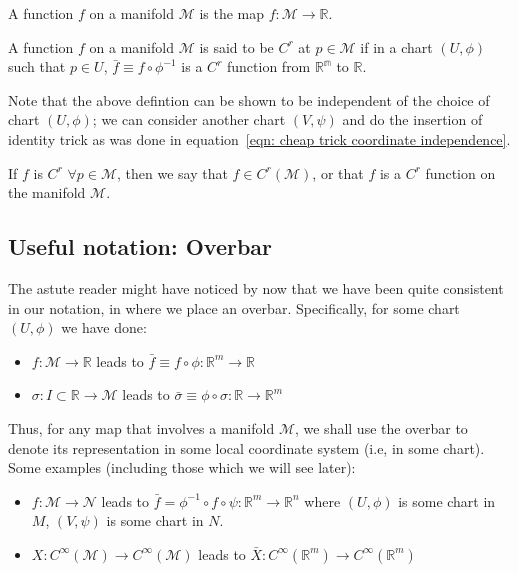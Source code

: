     \begin{definition}
      A function $f$ on a manifold $\mathcal{M}$ is the map $f:\mathcal{M}
      \rightarrow \mathbb{R}$.
    \end{definition}
    \begin{definition}
      A function $f$ on a manifold $\mathcal{M}$ is said to be $C^r$ at $p
      \in \mathcal{M}$ if in a chart $(U,\phi)$ such that $p\in U$,
      $\bar{f} \equiv f \circ \phi^{-1}$ is a $C^r$ function from
      $\mathbb{R^m}$ to $\mathbb{R}$.

      Note that the above defintion can be shown to be independent of the
      choice of chart $(U,\phi)$; we can consider another chart $(V, \psi)$
      and do the insertion of identity trick as was done in
      equation~\ref{eqn: cheap trick coordinate independence}.

      If $f$ is $C^r \,\, \forall p \in \mathcal{M}$, then we say that $f \in
      C^r(\mathcal{M})$, or that $f$ is a $C^r$ function on the manifold
      $\mathcal{M}$.
    \end{definition}
    \subsection{Useful notation: Overbar}
      The astute reader might have noticed by now that we have been quite
      consistent in our notation, in where we place an overbar.
      Specifically, for some chart $(U,\phi)$ we have done:
      \begin{itemize}
        \item{$f:\mathcal{M}\rightarrow \mathbb{R}$ leads to $\bar{f} \equiv f \circ \phi:\mathbb{R}^m \rightarrow \mathbb{R}$}
        \item{$\sigma:I \subset \mathbb{R} \rightarrow \mathcal{M}$ leads to
        $\bar{\sigma}\equiv \phi \circ \sigma: \mathbb{R} \rightarrow \mathbb{R}^m$}
      \end{itemize}
      Thus, for any map that involves a manifold $\mathcal{M}$, we shall
      use the overbar to denote its representation in some local coordinate
      system (i.e, in some chart). Some examples (including those which we will see later):
      \begin{itemize}
        \item{$f:\mathcal{M}\rightarrow \mathcal{N}$ leads to $\bar{f} =
        \phi^{-1}\circ f \circ \psi: \mathbb{R}^m \rightarrow \mathbb{R}^n$
        where $(U,\phi)$ is some chart in $M$, $(V,\psi)$ is some chart in
        $N$.}
        \item{$X: C^\infty(\mathcal{M})\rightarrow C^\infty(\mathcal{M})$
        leads to $\bar{X}:C^\infty(\mathbb{R}^m)\rightarrow
        C^\infty(\mathbb{R}^m)$}
      \end{itemize}
